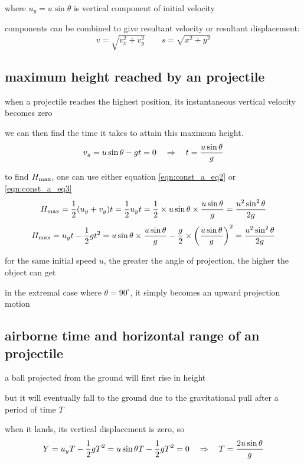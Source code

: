 where $u_y = u\sin\theta$ is vertical component of initial velocity

\cmt components can be combined to give resultant velocity or resultant displacement:
\begin{equation*}
 v = \sqrt{v_x^2 + v_y^2} \qquad s = \sqrt{x^2 + y^2}
\end{equation*}


\subsection*{maximum height reached by an projectile}

when a projectile reaches the highest position, its instantaneous vertical velocity becomes zero

we can then find the time it takes to attain this maximum height.
\begin{equation*}
	v_y = u\sin\theta - gt = 0 \quad \Rightarrow \quad t = \frac{u\sin\theta}{g}
\end{equation*}
	
to find $H_{\text{max}}$, one can use either equation \eqref{eqn:const_a_eq2} or \eqref{eqn:const_a_eq3} 
	\begin{equation*}
	H_{\text{max}} = \frac{1}{2}(u_y+v_y) t = \frac{1}{2}u_y t = \frac{1}{2} \times u \sin\theta \times \frac{u\sin\theta}{g} = \frac{u^2 \sin^2\theta}{2g}
	\end{equation*}
	\begin{equation*}
	H_{\text{max}} = u_y t - \frac{1}{2}gt^2 = u \sin\theta \times \frac{u\sin\theta}{g} - \frac{g}{2} \times \left(\frac{u\sin\theta}{g}\right)^2 = \frac{u^2 \sin^2\theta}{2g}
	\end{equation*}

\cmt for the same initial speed $u$, the greater the angle of projection, the higher the object can get

in the extremal case where $\theta = 90 ^\circ$, it simply becomes an upward projection motion

\subsection*{airborne time and horizontal range of an projectile}

a ball projected from the ground will first rise in height

but it will eventually fall to the ground due to the gravitational pull after a period of time $T$

when it lands, its vertical displacement is zero, so
	\begin{equation*}
	Y = u_y T - \frac{1}{2}gT^2 = u \sin \theta T - \frac{1}{2}gT^2 = 0 \quad \Rightarrow \quad T = \frac{2u\sin\theta}{g}
	\end{equation*}
	
